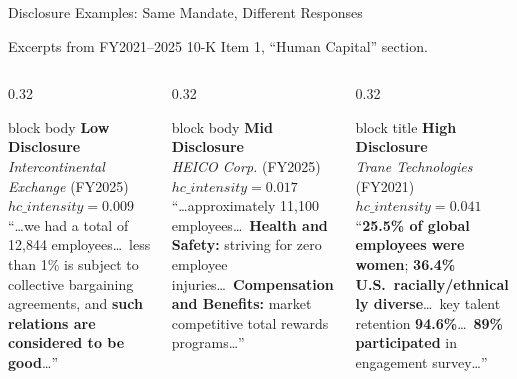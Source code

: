 \documentclass[aspectratio=169]{beamer}
\begin{document}
\begin{frame}{Disclosure Examples: Same Mandate, Different Responses}

{\scriptsize Excerpts from FY2021--2025 10-K Item 1, ``Human Capital'' section.}

\vspace{4pt}

\begin{columns}[T]

\begin{column}{0.32\textwidth}
\begin{beamercolorbox}[sep=4pt,rounded=true]{block body}
{\footnotesize\bfseries\color{gray!50!black} Low Disclosure}\\[1pt]
{\scriptsize \textit{Intercontinental Exchange} (FY2025)\\
$hc\_intensity = 0.009$}\\[3pt]
{\scriptsize ``\ldots we had a total of 12{,}844 employees\ldots\ less than 1\% is subject to collective bargaining agreements, and \textbf{such relations are considered to be good}\ldots''}
\end{beamercolorbox}
\end{column}

\begin{column}{0.32\textwidth}
\begin{beamercolorbox}[sep=4pt,rounded=true]{block body}
{\footnotesize\bfseries\color{OUcrimson!70!black} Mid Disclosure}\\[1pt]
{\scriptsize \textit{HEICO Corp.} (FY2025)\\
$hc\_intensity = 0.017$}\\[3pt]
{\scriptsize ``\ldots approximately 11{,}100 employees\ldots\ \textbf{Health and Safety:} striving for zero employee injuries\ldots\ \textbf{Compensation and Benefits:} market competitive total rewards programs\ldots''}
\end{beamercolorbox}
\end{column}

\begin{column}{0.32\textwidth}
\begin{beamercolorbox}[sep=4pt,rounded=true]{block title}
{\footnotesize\bfseries High Disclosure}\\[1pt]
{\scriptsize \textit{Trane Technologies} (FY2021)\\
$hc\_intensity = 0.041$}\\[3pt]
{\scriptsize ``\textbf{25.5\% of global employees were women}; \textbf{36.4\% U.S.\ racially/ethnically diverse}\ldots\ key talent retention \textbf{94.6\%}\ldots\ \textbf{89\% participated} in engagement survey\ldots''}
\end{beamercolorbox}
\end{column}


\end{columns}
\end{frame}
\end{document}
